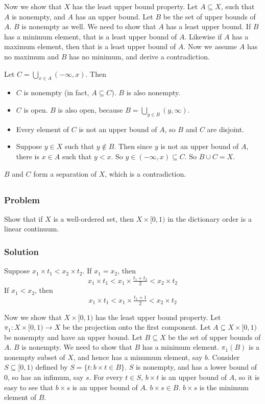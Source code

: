 Now we show that $X$ has the least upper bound property. Let $A \subseteq X$, such that $A$ is nonempty, and $A$ has an upper bound. Let $B$ be the set of upper bounds of $A$. $B$ is nonempty as well. We need to show that $A$ has a least upper bound. If $B$ has a minimum element, that is a least upper bound of $A$. Likewise if $A$ has a maximum element, then that is a least upper bound of $A$. Now we assume $A$ has no maximum and $B$ has no minimum, and derive a contradiction.

Let $C = \bigcup_{x \in A} (-\infty, x)$. Then 
\begin{itemize}
\item $C$ is nonempty (in fact, $A \subseteq C$). $B$ is also nonempty.
\item $C$ is open. $B$ is also open, because $B = \bigcup_{y \in B} (y, \infty)$.
\item Every element of $C$ is not an upper bound of $A$, so $B$ and $C$ are disjoint.
\item Suppose $y \in X$ such that $y \notin B$. Then since $y$ is not an upper bound of $A$, there is $x \in A$ such that $y < x$. So $y \in (-\infty, x) \subseteq C$. So $B \cup C = X$.
\end{itemize}
$B$ and $C$ form a separation of $X$, which is a contradiction.


\setcounter{subsection}{5} %
\subsection{}

\subsubsection{Problem}
Show that if $X$ is a well-ordered set, then $X \times [0,1)$ in the dictionary order is a linear continuum.

\subsubsection{Solution}
Suppose $x_1 \times t_1 < x_2 \times t_2$. If $x_1 = x_2$, then
\[x_1 \times t_1 <x_1 \times \tfrac{t_1+t_2}{2} <x_2 \times t_2\]
If $x_1 < x_2$, then
\[x_1 \times t_1 <x_1 \times \tfrac{t_1+1}{2} <x_2 \times t_2\]

Now we show that $X \times [0,1)$ has the least upper bound property. Let $\pi_1 : X \times [0,1) \to X$ be the projection onto the first component. Let $A \subseteq X \times [0,1)$ be nonempty and have an upper bound. Let $B \subseteq X$ be the set of upper bounds of $A$. $B$ is nonempty. We need to show that $B$ has a minimum element. $\pi_1(B)$ is a nonempty subset of $X$, and hence has a minumum element, say $b$. Consider $S \subseteq [0,1)$ defined by $S = \{t : b \times t \in B\}$. $S$ is nonempty, and has a lower bound of $0$, so has an infimum, say $s$. For every $t \in S$, $b \times t$ is an upper bound of $A$, so it is easy to see that $b \times s$ is an upper bound of $A$. $b \times s \in B$. $b \times s$ is the minimum element of $B$.
